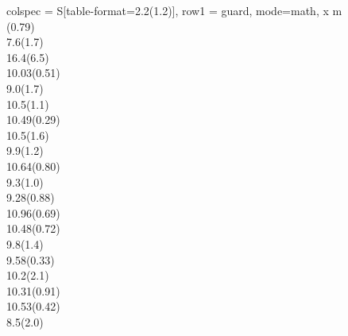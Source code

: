 \documentclass[
  captions=tableheading,
]{scrartcl}
\begin{document}
\begin{table}
  \centering
  \caption{
    Eine Tabelle mit Messdaten.
    Wir werden später lernen, wie man sie zentriert.
  }
  
\end{table}

\begin{table}
  \centering
  \caption{Eine Tabelle mit Messwerten und Unsicherheiten.}
  \begin{tblr}{
      colspec = {S[table-format=2.2(1.2)]},
      row{1} = {guard, mode=math},
  }
    \toprule
    x \mathbin{/} \unit{\meter} \\
    (0.79) \\
     7.6(1.7)   \\
    16.4(6.5)   \\
    10.03(0.51) \\
     9.0(1.7)   \\
    10.5(1.1)   \\
    10.49(0.29) \\
    10.5(1.6)   \\
     9.9(1.2)   \\
    10.64(0.80) \\
     9.3(1.0)   \\
     9.28(0.88) \\
    10.96(0.69) \\
    10.48(0.72) \\
     9.8(1.4)   \\
     9.58(0.33) \\
    10.2(2.1)   \\
    10.31(0.91) \\
    10.53(0.42) \\
     8.5(2.0)   \\
    \bottomrule
  \end{tblr}
\end{table}
\end{document}
